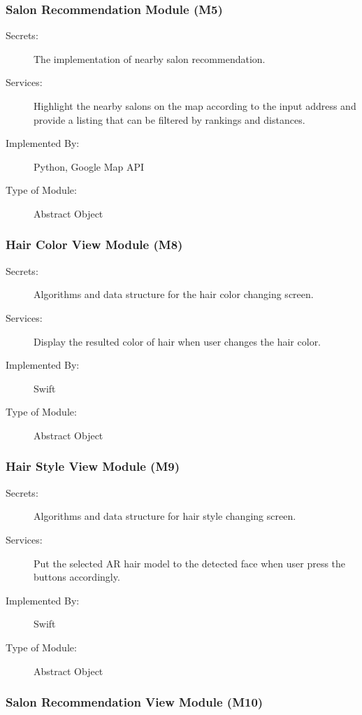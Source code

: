 \documentclass[12pt, titlepage]{article}
\begin{document}
\subsubsection{Salon Recommendation Module (M5)}

\begin{description}
\item[Secrets:] The implementation of nearby salon recommendation.
\item[Services:] Highlight the nearby salons on the map according to the input address and provide a listing that can be filtered by rankings and distances.

\item[Implemented By:] Python, Google Map API
\item[Type of Module:] Abstract Object
\end{description}

\subsubsection{Hair Color View Module (M8)}

\begin{description}
\item[Secrets:] Algorithms and data structure for the hair color changing screen.
\item[Services:] Display the resulted color of hair when user changes the hair color.
\item[Implemented By:] Swift
\item[Type of Module:] Abstract Object
\end{description}

\subsubsection{Hair Style View Module (M9)}

\begin{description}
\item[Secrets:] Algorithms and data structure for hair style changing screen.
\item[Services:] Put the selected AR hair model to the detected face when user press the buttons accordingly.
\item[Implemented By:] Swift
\item[Type of Module:] Abstract Object
\end{description}

\subsubsection{Salon Recommendation View Module (M10)}
\end{document}

